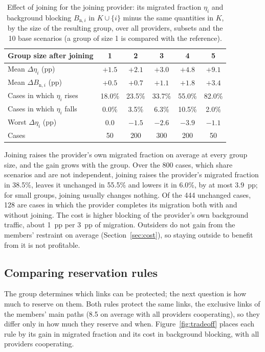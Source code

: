 \documentclass[11pt,a4paper]{article}
\theoremstyle{definition}
\begin{document}
\begin{table}[!tb]
\centering
\small
\caption{Effect of joining for the joining provider: its migrated fraction $\eta_i$ and background blocking $B_{\mathrm{n},i}$ in $K\cup\{i\}$ minus the same quantities in $K$, by the size of the resulting group, over all providers, subsets and the 10 base scenarios (a group of size 1 is compared with the reference).}
\label{tab:join}
\begin{tabular}{@{}lccccc@{}}
\toprule
Group size after joining & 1 & 2 & 3 & 4 & 5 \\
\midrule
Mean $\Delta\eta_i$ (pp) & $+1.5$ & $+2.1$ & $+3.0$ & $+4.8$ & $+9.1$ \\
Mean $\Delta B_{\mathrm{n},i}$ (pp) & $+0.5$ & $+0.7$ & $+1.1$ & $+1.8$ & $+3.4$ \\
Cases in which $\eta_i$ rises & 18.0\% & 23.5\% & 33.7\% & 55.0\% & 82.0\% \\
Cases in which $\eta_i$ falls & 0.0\% & 3.5\% & 6.3\% & 10.5\% & 2.0\% \\
Worst $\Delta\eta_i$ (pp) & $0.0$ & $-1.5$ & $-2.6$ & $-3.9$ & $-1.1$ \\
Cases & 50 & 200 & 300 & 200 & 50 \\
\bottomrule
\end{tabular}
\end{table}

Joining raises the provider's own migrated fraction on average at every group size, and the gain grows with the group.
Over the 800 cases, which share scenarios and are not independent, joining raises the provider's migrated fraction in 38.5\%, leaves it unchanged in 55.5\% and lowers it in 6.0\%, by at most $3.9$~pp; for small groups, joining usually changes nothing. Of the 444 unchanged cases, 128 are cases in which the provider completes its migration both with and without joining.
The cost is higher blocking of the provider's own background traffic, about 1~pp per 3~pp of migration.
Outsiders do not gain from the members' restraint on average (Section~\ref{sec:cost}), so staying outside to benefit from it is not profitable.

\subsection{Comparing reservation rules}
\label{sec:rules}

The group determines which links can be protected; the next question is how much to reserve on them.
Both rules protect the same links, the exclusive links of the members' main paths (8.5 on average with all providers cooperating), so they differ only in how much they reserve and when.
Figure~\ref{fig:tradeoff} places each rule by its gain in migrated fraction and its cost in background blocking, with all providers cooperating.
\end{document}
